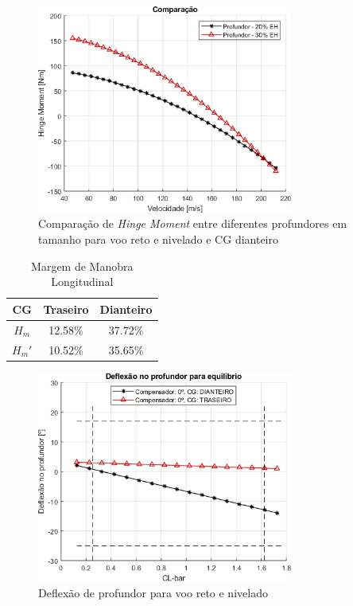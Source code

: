\begin{figure}[H]
\centering
\includegraphics[width=0.75\textwidth]{images/parte3/comparacao_hingemoment.png}
\caption[Comparação de \textit{Hinge Moment} entre diferentes profundores em tamanho]{Comparação de \textit{Hinge Moment} entre diferentes profundores em tamanho para voo reto e nivelado e CG dianteiro}
\label{fig:comp_hingemoment}
\end{figure}


\begin{table}[H]
\centering
\begin{tabular}{ccc}
\toprule
CG & Traseiro & Dianteiro \\ \midrule
$ H_m $ & 12.58\% & 37.72\% \\
$ H_m' $ & 10.52\% & 35.65\% \\
\bottomrule
\end{tabular}
\caption[Margem de Manobra Longitudinal]{Margem de Manobra Longitudinal}
\label{tbl:margem_manobra}
\end{table}

\begin{figure}[H]
\centering
\includegraphics[width=0.75\textwidth]{images/parte3/De_equi_c20.png}
\caption[Deflexão de profundor para voo reto e nivelado]{Deflexão de profundor para voo reto e nivelado}
\label{fig:def_voo1g}
\end{figure}

